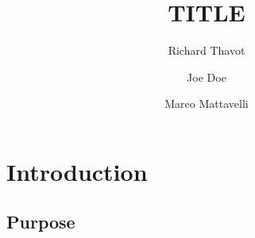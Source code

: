\documentclass[appnote]{arvhott}
\title{TITLE}
\author{Richard Thavot \and Joe Doe \and Marco Mattavelli}
\begin{document}

\maketitle


\section{Introduction}
\subsection{Purpose}
\begin{comment}
This is a lab template which has a ton of different things which are useful in writing lab write-ups in the Computer Eningeering field.  This is demonstrating the comment block. Don't be overwhelmed, it may seem like a lot to take in at a time, but it's worth spending the time learning it.
\end{comment}

\end{document}
